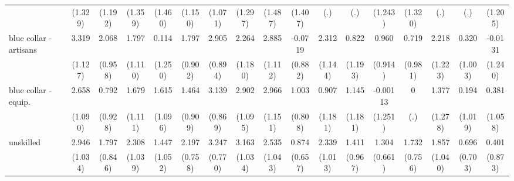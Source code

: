 {\begin{tabular}{l*{16}{c}}
                    &     (1.329)         &     (1.192)         &     (1.359)         &     (1.460)         &     (1.150)         &     (1.071)         &     (1.297)         &     (1.487)         &     (1.407)         &         (.)         &         (.)         &     (1.243)         &     (1.320)         &         (.)         &         (.)         &     (1.205)         \\
[1em]
blue collar - artisans&       3.319\sym{**} &       2.068\sym{*}  &       1.797         &       0.114         &       1.797\sym{*}  &       2.905\sym{**} &       2.264         &       2.885\sym{**} &     -0.0719         &       2.312\sym{*}  &       0.822         &       0.960         &       0.719         &       2.218         &       0.320         &     -0.0131         \\
                    &     (1.127)         &     (0.958)         &     (1.110)         &     (1.250)         &     (0.902)         &     (0.894)         &     (1.180)         &     (1.112)         &     (0.882)         &     (1.144)         &     (1.193)         &     (0.914)         &     (0.981)         &     (1.223)         &     (1.003)         &     (1.240)         \\
[1em]
blue collar - equip.&       2.658\sym{*}  &       0.792         &       1.679         &       1.615         &       1.464         &       3.139\sym{***}&       2.902\sym{**} &       2.966\sym{**} &       1.003         &       0.907         &       1.145         &    -0.00113         &           0         &       1.377         &       0.194         &       0.381         \\
                    &     (1.090)         &     (0.928)         &     (1.111)         &     (1.096)         &     (0.909)         &     (0.869)         &     (1.095)         &     (1.151)         &     (0.808)         &     (1.181)         &     (1.181)         &     (1.251)         &         (.)         &     (1.278)         &     (1.019)         &     (1.058)         \\
[1em]
unskilled           &       2.946\sym{**} &       1.797\sym{*}  &       2.308\sym{*}  &       1.447         &       2.197\sym{**} &       3.247\sym{***}&       3.163\sym{**} &       2.535\sym{*}  &       0.874         &       2.339\sym{*}  &       1.411         &       1.304\sym{*}  &       1.732\sym{*}  &       1.857         &       0.696         &       0.401         \\
                    &     (1.034)         &     (0.846)         &     (1.039)         &     (1.052)         &     (0.758)         &     (0.770)         &     (1.034)         &     (1.043)         &     (0.657)         &     (1.013)         &     (0.967)         &     (0.661)         &     (0.756)         &     (1.040)         &     (0.703)         &     (0.873)         \\

\end{tabular}}
